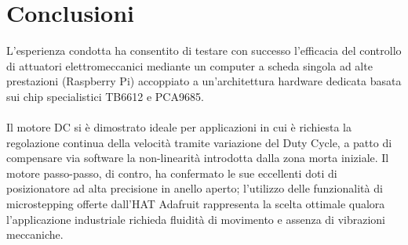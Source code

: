 \documentclass{article}
\begin{document}
\section{Conclusioni}
L'esperienza condotta ha consentito di testare con successo l'efficacia del controllo di attuatori elettromeccanici mediante un computer a scheda singola ad alte prestazioni (Raspberry Pi) accoppiato a un'architettura hardware dedicata basata sui chip specialistici TB6612 e PCA9685. 
\\ \\
\noindent Il motore DC si è dimostrato ideale per applicazioni in cui è richiesta la regolazione continua della velocità tramite variazione del Duty Cycle, a patto di compensare via software la non-linearità introdotta dalla zona morta iniziale. Il motore passo-passo, di contro, ha confermato le sue eccellenti doti di posizionatore ad alta precisione in anello aperto; l'utilizzo delle funzionalità di microstepping offerte dall'HAT Adafruit rappresenta la scelta ottimale qualora l'applicazione industriale richieda fluidità di movimento e assenza di vibrazioni meccaniche.
\end{document}
